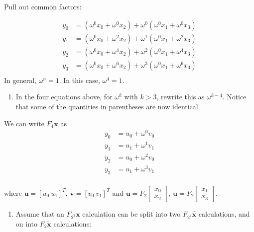 \documentclass[12pt,letterpaper,noanswers]{exam}
\newcommand{\vc}[1]{\boldsymbol{#1}}
\begin{document}
Pull out common factors:

\begin{align*}
y_0 &= (\omega^0x_0 + \omega^0x_2) + \omega^0(\omega^0x_1+\omega^0x_3) \\
y_1 &= (\omega^0x_0 + \omega^2x_2) + \omega^1(\omega^0x_1+\omega^2x_3) \\
y_2 &= (\omega^0x_0 + \omega^4x_2) + \omega^2(\omega^0x_1+\omega^4x_3) \\
y_3 &= (\omega^0x_0 + \omega^6x_2) + \omega^3(\omega^0x_1+\omega^6x_3) \\
\end{align*}
In general, $\omega^n = 1$.  In this case, $\omega^4 = 1$.
\begin{enumerate}[resume=classQ]
\item In the four equations above, for $\omega^k$ with $k>3$, rewrite this as $\omega^{k-4}$.  Notice that some of the quantities in parentheses are now identical.
\vspace{1.5in}
\end{enumerate}

We can write $F_4\vc{x}$ as
\begin{align*}
y_0 &= u_0 + \omega^0v_0 \\
y_1 &= u_1 + \omega^1v_1 \\
y_2 &= u_0 + \omega^2v_0 \\
y_3 &= u_1 + \omega^3v_1 \\
\end{align*}

where $\vc{u} = [u_0\ u_1]^T$, $\vc{v} = [v_0\ v_1]^T$ and $\vc{u} = F_2\left[\begin{array}{c} x_0 \\ x_2 \end{array}\right]$, $\vc{u} = F_2\left[\begin{array}{c} x_1 \\ x_3\end{array} \right]$.

\begin{enumerate}[resume=classQ]
\item Assume that an $F_{2^5}\vc{x}$ calculation can be split into two $F_{2^4}\hat{\vc{x}}$ calculations, and on into $F_2\tilde{\vc{x}}$ calculations:
\end{enumerate}
\end{document}
